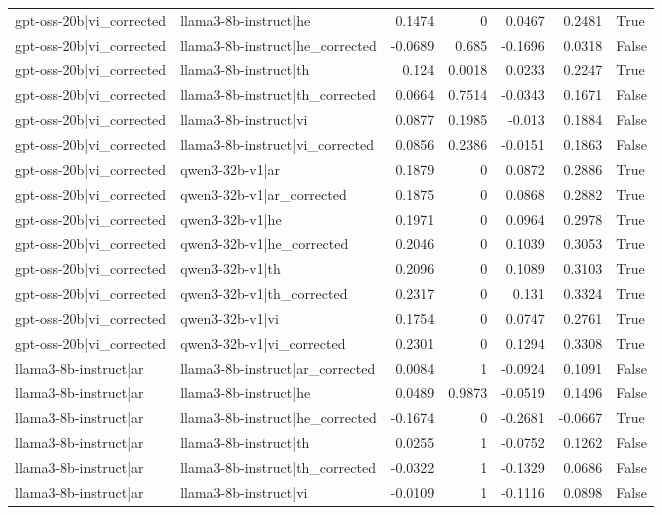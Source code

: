 \begin{table}
\begin{tabular}{l l r r r r l}
gpt-oss-20b|vi_corrected & llama3-8b-instruct|he & 0.1474 & 0 & 0.0467 & 0.2481 & True \\
gpt-oss-20b|vi_corrected & llama3-8b-instruct|he_corrected & -0.0689 & 0.685 & -0.1696 & 0.0318 & False \\
gpt-oss-20b|vi_corrected & llama3-8b-instruct|th & 0.124 & 0.0018 & 0.0233 & 0.2247 & True \\
gpt-oss-20b|vi_corrected & llama3-8b-instruct|th_corrected & 0.0664 & 0.7514 & -0.0343 & 0.1671 & False \\
gpt-oss-20b|vi_corrected & llama3-8b-instruct|vi & 0.0877 & 0.1985 & -0.013 & 0.1884 & False \\
gpt-oss-20b|vi_corrected & llama3-8b-instruct|vi_corrected & 0.0856 & 0.2386 & -0.0151 & 0.1863 & False \\
gpt-oss-20b|vi_corrected & qwen3-32b-v1|ar & 0.1879 & 0 & 0.0872 & 0.2886 & True \\
gpt-oss-20b|vi_corrected & qwen3-32b-v1|ar_corrected & 0.1875 & 0 & 0.0868 & 0.2882 & True \\
gpt-oss-20b|vi_corrected & qwen3-32b-v1|he & 0.1971 & 0 & 0.0964 & 0.2978 & True \\
gpt-oss-20b|vi_corrected & qwen3-32b-v1|he_corrected & 0.2046 & 0 & 0.1039 & 0.3053 & True \\
gpt-oss-20b|vi_corrected & qwen3-32b-v1|th & 0.2096 & 0 & 0.1089 & 0.3103 & True \\
gpt-oss-20b|vi_corrected & qwen3-32b-v1|th_corrected & 0.2317 & 0 & 0.131 & 0.3324 & True \\
gpt-oss-20b|vi_corrected & qwen3-32b-v1|vi & 0.1754 & 0 & 0.0747 & 0.2761 & True \\
gpt-oss-20b|vi_corrected & qwen3-32b-v1|vi_corrected & 0.2301 & 0 & 0.1294 & 0.3308 & True \\
llama3-8b-instruct|ar & llama3-8b-instruct|ar_corrected & 0.0084 & 1 & -0.0924 & 0.1091 & False \\
llama3-8b-instruct|ar & llama3-8b-instruct|he & 0.0489 & 0.9873 & -0.0519 & 0.1496 & False \\
llama3-8b-instruct|ar & llama3-8b-instruct|he_corrected & -0.1674 & 0 & -0.2681 & -0.0667 & True \\
llama3-8b-instruct|ar & llama3-8b-instruct|th & 0.0255 & 1 & -0.0752 & 0.1262 & False \\
llama3-8b-instruct|ar & llama3-8b-instruct|th_corrected & -0.0322 & 1 & -0.1329 & 0.0686 & False \\
llama3-8b-instruct|ar & llama3-8b-instruct|vi & -0.0109 & 1 & -0.1116 & 0.0898 & False \\

\end{tabular}
\end{table}
